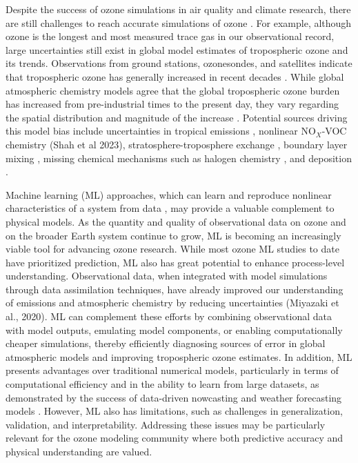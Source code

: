 \documentclass[gmd, manuscript]{copernicus}
\begin{document}
Despite the success of ozone simulations in air quality and climate research, there are still challenges to reach accurate simulations of ozone \citep{young_tropospheric_2018}. For example, although ozone is the longest and most measured trace gas in our observational record, large uncertainties still exist in global model estimates of tropospheric ozone and its trends. Observations from ground stations, ozonesondes, and satellites indicate that tropospheric ozone has generally increased in recent decades \citep{ziemke_trends_2019, young_tropospheric_2018, IPCC_2021_WGI_Ch_2}. While global atmospheric chemistry models agree that the global tropospheric ozone burden has increased from pre-industrial times to the present day, they vary regarding the spatial distribution and magnitude of the increase \citep{skeie_historical_2020, christiansen_multidecadal_2022, fiore_understanding_2022}. Potential sources driving this model bias include uncertainties in tropical emissions \citep{zhang_contributions_2021}, nonlinear NO$_X$-VOC chemistry (Shah et al 2023), stratosphere-troposphere exchange \citep{neu_tropospheric_2014}, boundary layer mixing \citep{lu_exploring_2019}, missing chemical mechanisms such as halogen chemistry \citep{wang_active_2015}, and deposition \citep{clifton_dry_2020}. 

Machine learning (ML) approaches, which can learn and reproduce nonlinear characteristics of a system from data \citep{hornik_multilayer_1989}, may provide a valuable complement to physical models. As the quantity and quality of observational data on ozone \citep{Schultz2017} and on the broader Earth system \citep{doi:10.1080/17538947.2016.1250829,reichstein_deep_2019} continue to grow, ML is becoming an increasingly viable tool for advancing ozone research. While most ozone ML studies to date have prioritized prediction, ML also has great potential to enhance process-level understanding. Observational data, when integrated with model simulations through data assimilation techniques, have already improved our understanding of emissions and atmospheric chemistry by reducing uncertainties (Miyazaki et al., 2020). ML can complement these efforts by combining observational data with model outputs, emulating model components, or enabling computationally cheaper simulations, thereby efficiently diagnosing sources of error in global atmospheric models and improving tropospheric ozone estimates. In addition, ML presents advantages over traditional numerical models, particularly in terms of computational efficiency and in the ability to learn from large datasets, as demonstrated by the success of data-driven nowcasting and weather forecasting models \citep{bi_accurate_2023, lam_learning_2023, price_gencast_2024}. However, ML also has limitations, such as challenges in generalization, validation, and interpretability. Addressing these issues may be particularly relevant for the ozone modeling community where both predictive accuracy and physical understanding are valued.
 
\end{document}
